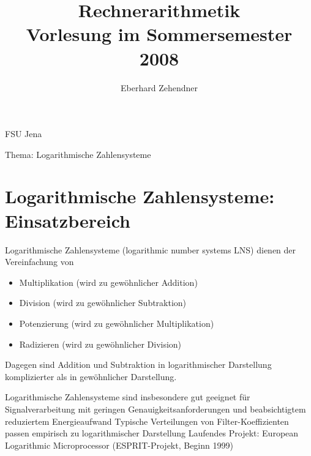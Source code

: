 \documentclass[10pt]{article}
\title{Rechnerarithmetik \\
 Vorlesung im Sommersemester 2008 }
\author{Eberhard Zehendner}
\date{}
\begin{document}
\maketitle
FSU Jena

Thema: Logarithmische Zahlensysteme

\section*{Logarithmische Zahlensysteme: Einsatzbereich}
Logarithmische Zahlensysteme (logarithmic number systems LNS) dienen der Vereinfachung von

\begin{itemize}
  \item Multiplikation (wird zu gewöhnlicher Addition)
  \item Division (wird zu gewöhnlicher Subtraktion)
  \item Potenzierung (wird zu gewöhnlicher Multiplikation)
  \item Radizieren (wird zu gewöhnlicher Division)
\end{itemize}

Dagegen sind Addition und Subtraktion in logarithmischer Darstellung komplizierter als in gewöhnlicher Darstellung.

Logarithmische Zahlensysteme sind insbesondere gut geeignet für Signalverarbeitung mit geringen Genauigkeitsanforderungen und beabsichtigtem reduziertem Energieaufwand Typische Verteilungen von Filter-Koeffizienten passen empirisch zu logarithmischer Darstellung Laufendes Projekt: European Logarithmic Microprocessor (ESPRIT-Projekt, Beginn 1999)
\end{document}
